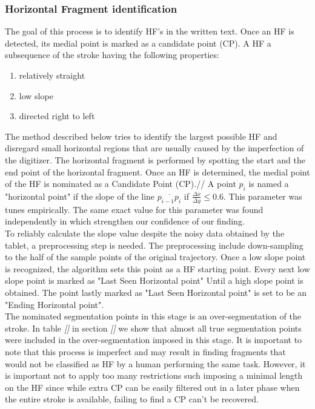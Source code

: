 \documentclass[journal,compsoc]{IEEEtran}
\begin{document}
\subsubsection{Horizontal Fragment identification}
The goal of this process is to identify HF's in the written text. Once an HF is detected, its medial point is marked as a candidate point (CP). A HF a subsequence of the stroke having the following properties: 
\begin{enumerate}
\item relatively straight
\item low slope
\item directed right to left 
\end{enumerate}
The method described below tries to identify the largest possible HF and disregard small horizontal regions that are usually caused by the imperfection of the digitizer. The horizontal fragment is performed by spotting the start and the end point of the horizontal fragment.
Once an HF is determined, the medial point of the HF is nominated as a Candidate Point (CP).//
A point $p_{i}$ is named a "horizontal point" if the slope of the line $\overline{p_{i-1}p_{i}}$ if $\frac{\Delta x}{\Delta y}\leq0.6$. This parameter was tunes empirically. The same exact value for this parameter was found independently in \cite{daifallah2009recognition} which strengthen our confidence of our finding.\\
To reliably calculate the slope value despite the noisy data obtained by the tablet, a preprocessing step is needed. The preprocessing include down-sampling to the half of the sample points of the original trajectory.
Once a low slope point is recognized, the algorithm sets this point as a HF starting point. Every next low slope point is marked as "Last Seen Horizontal point" Until a high slope point is obtained. The point lastly marked as "Last Seen Horizontal point" is set to be an "Ending Horizontal point".\\

The nominated segmentation points in this stage is an over-segmentation of the stroke. In table \emph{[]} in section \emph{[]} we show that almost all true segmentation points were included in the over-segmentation imposed in this stage. 
It is important to note that this process is imperfect and may result in finding fragments that would not be classified as HF by a human performing the same task. However, it is important not to apply too many restrictions such imposing a minimal length on the HF since while extra CP can be easily filtered out in a later phase when the entire stroke is available, failing to find a CP can't be recovered.\\
\end{document}

